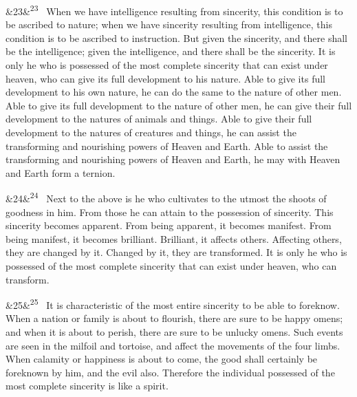 \documentclass[12pt]{article}
\newcommand{\para}[1][]{\par\noindent\ifx&#1&\else\textsuperscript{\footnotesize #1}~\fi}
\begin{document}
\para[23] When we have intelligence resulting from sincerity, this condition is to be ascribed to nature; when we have sincerity resulting from intelligence, this condition is to be ascribed to instruction. But given the sincerity, and there shall be the intelligence; given the intelligence, and there shall be the sincerity. It is only he who is possessed of the most complete sincerity that can exist under heaven, who can give its full development to his nature. Able to give its full development to his own nature, he can do the same to the nature of other men. Able to give its full development to the nature of other men, he can give their full development to the natures of animals and things. Able to give their full development to the natures of creatures and things, he can assist the transforming and nourishing powers of Heaven and Earth. Able to assist the transforming and nourishing powers of Heaven and Earth, he may with Heaven and Earth form a ternion.

\para[24] Next to the above is he who cultivates to the utmost the shoots of goodness in him. From those he can attain to the possession of sincerity. This sincerity becomes apparent. From being apparent, it becomes manifest. From being manifest, it becomes brilliant. Brilliant, it affects others. Affecting others, they are changed by it. Changed by it, they are transformed. It is only he who is possessed of the most complete sincerity that can exist under heaven, who can transform.

\para[25] It is characteristic of the most entire sincerity to be able to foreknow. When a nation or family is about to flourish, there are sure to be happy omens; and when it is about to perish, there are sure to be unlucky omens. Such events are seen in the milfoil and tortoise, and affect the movements of the four limbs. When calamity or happiness is about to come, the good shall certainly be foreknown by him, and the evil also. Therefore the individual possessed of the most complete sincerity is like a spirit.
\end{document}
